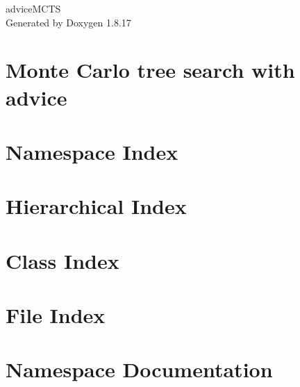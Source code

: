 \let\mypdfximage\pdfximage\def\pdfximage{\immediate\mypdfximage}\documentclass[twoside]{book}
\newcommand{\+}{\discretionary{\mbox{\scriptsize$\hookleftarrow$}}{}{}}
\newcommand{\clearemptydoublepage}{%
  \newpage{\pagestyle{empty}\cleardoublepage}%
}
\begin{document}
\hypersetup{pageanchor=false,
             bookmarksnumbered=true,
             pdfencoding=unicode
            }
\begin{titlepage}
\vspace*{7cm}
\begin{center}%
{\Large advice\+M\+C\+TS }\\
\vspace*{1cm}
{\large Generated by Doxygen 1.8.17}\\
\end{center}
\end{titlepage}
\clearemptydoublepage
{}
\tableofcontents
\clearemptydoublepage
{}
\hypersetup{pageanchor=true}

\chapter{Monte Carlo tree search with advice}
\label{index}\hypertarget{index}{}
\chapter{Namespace Index}

\chapter{Hierarchical Index}

\chapter{Class Index}

\chapter{File Index}

\chapter{Namespace Documentation}













\end{document}
